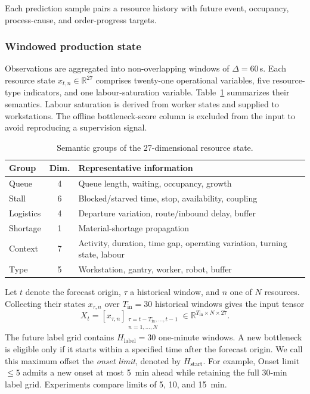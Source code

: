 \documentclass[a4paper,fleqn]{cas-dc}
\begin{document}
Each prediction sample pairs a resource history with future event, occupancy, process-cause, and order-progress targets.

\subsubsection{Windowed production state}

Observations are aggregated into non-overlapping windows of $\Delta=60$\,s. Each resource state $x_{t,n}\in\mathbb{R}^{27}$ comprises twenty-one operational variables, five resource-type indicators, and one labour-saturation variable. Table~\ref{tab:feature-groups} summarizes their semantics. Labour saturation is derived from worker states and supplied to workstations. The offline bottleneck-score column is excluded from the input to avoid reproducing a supervision signal.

\begin{table}[pos=t]
\centering
\caption{Semantic groups of the 27-dimensional resource state.}
\label{tab:feature-groups}
\scriptsize
\setlength{\tabcolsep}{3pt}
\renewcommand{\arraystretch}{1.12}
\begin{tabularx}{\columnwidth}{@{}l c >{\raggedright\arraybackslash}X@{}}
\toprule
Group & Dim. & Representative information \\
\midrule
Queue & 4 & Queue length, waiting, occupancy, growth \\
Stall & 6 & Blocked/starved time, stop, availability, coupling \\
Logistics & 4 & Departure variation, route/inbound delay, buffer \\
Shortage & 1 & Material-shortage propagation \\
Context & 7 & Activity, duration, time gap, operating variation, turning state, labour \\
Type & 5 & Workstation, gantry, worker, robot, buffer \\
\bottomrule
\end{tabularx}
\end{table}

Let $t$ denote the forecast origin, $\tau$ a historical window, and $n$ one of $N$ resources. Collecting their states $x_{\tau,n}$ over $T_{\mathrm{in}}=30$ historical windows gives the input tensor
\begin{equation}
X_t=\left[x_{\tau,n}\right]_
{\substack{\tau=t-T_{\mathrm{in}},\ldots,t-1\\n=1,\ldots,N}}
\in\mathbb{R}^{T_{\mathrm{in}}\times N\times 27}.
\end{equation}
The future label grid contains $H_{\mathrm{label}}=30$ one-minute windows. A new bottleneck is eligible only if it starts within a specified time after the forecast origin. We call this maximum offset the \emph{onset limit}, denoted by $H_{\mathrm{start}}$. For example, Onset limit~$\leq5$ admits a new onset at most 5~min ahead while retaining the full 30-min label grid. Experiments compare limits of 5, 10, and 15~min.
\end{document}
